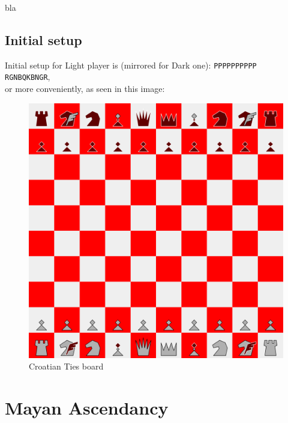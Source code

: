 \documentclass[a5paper,12pt,draft]{book} %
\begin{document}
\indent
bla

\clearpage

\section*{Initial setup}

Initial setup for Light player is (mirrored for Dark one):
\texttt{PPPPPPPPPP \\
        RGNBQKBNGR}, \\
or more conveniently, as seen in this image:

\noindent
\begin{figure}[h]
\includegraphics[width=1.0\textwidth, keepaspectratio=true]{../gfx/boards/04_croatian_ties.png}
\caption{Croatian Ties board}
\label{fig:croatian_ties}
\end{figure}

\clearpage

\chapter*{Mayan Ascendancy}
\end{document}
